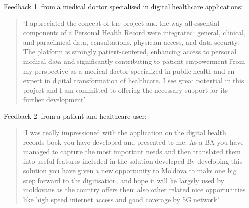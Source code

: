 Feedback 1, from a medical doctor specialised in digital healthcare applications:

\begin{quotation}
    `I appreciated the concept of the project and the way all essential components of a Personal Health Record were integrated: general, clinical, and paraclinical data, consultations, physician access, and data security. The platform is strongly patient-centered, enhancing access to personal medical data and significantly contributing to patient empowerment \textellipsis{} From my perspective as a medical doctor specialized in public health and an expert in digital transformation of healthcare, I see great potential in this project and I am committed to offering the necessary support for its further development'
\end{quotation}

Feedback 2, from a patient and healthcare user:

\begin{quotation}
    `I was really impressioned with the application on the digital health records book you have developed and presented to me. As a BA you have managed to capture the most important needs and then translated them into useful features included in the solution developed \textellipsis{} By developing this solution you have given a new opportunity to Moldova to make one big step forward to the digitisation, and hope it will be largely used by moldovans as the country offers them also other related nice opportunities like high speed internet access and good coverage by 5G network'
\end{quotation}